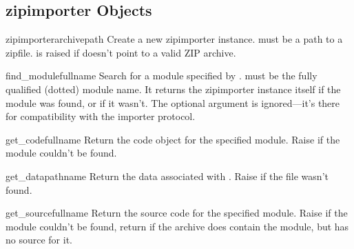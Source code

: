 \begin{seealso}


\end{seealso}


\subsection{zipimporter Objects \label{zipimporter-objects}}

\begin{classdesc}{zipimporter}{archivepath} 
  Create a new zipimporter instance.  must be a path to
  a zipfile.   is raised if  doesn't
  point to a valid ZIP archive.
\end{classdesc}

\begin{methoddesc}{find_module}{fullname}
  Search for a module specified by .  must be
  the fully qualified (dotted) module name. It returns the zipimporter
  instance itself if the module was found, or  if it wasn't.
  The optional  argument is ignored---it's there for 
  compatibility with the importer protocol.
\end{methoddesc}

\begin{methoddesc}{get_code}{fullname}
  Return the code object for the specified module. Raise
   if the module couldn't be found.
\end{methoddesc}

\begin{methoddesc}{get_data}{pathname}
  Return the data associated with . Raise 
  if the file wasn't found.
\end{methoddesc}

\begin{methoddesc}{get_source}{fullname}
  Return the source code for the specified module. Raise
   if the module couldn't be found, return
   if the archive does contain the module, but has
  no source for it.
\end{methoddesc}


